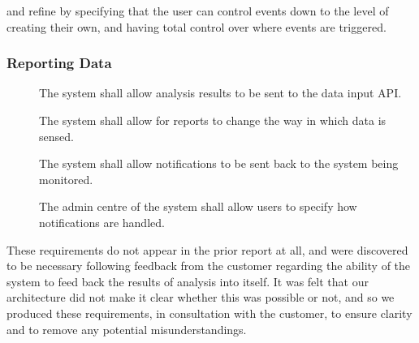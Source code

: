  and  refine  by specifying that the user can
control events down to the level of creating their own, and having
total control over where events are triggered.

\subsubsection{Reporting Data}
\label{sec:requirements-functional-feedback}

\begin{description}
 \item[] The system shall allow analysis results to be sent
 to the data input API.

 \item[] The system shall allow for reports to change the way
 in which data is sensed.

 \item[] The system shall allow notifications to be sent back
 to the system being monitored.

 \item[] The admin centre of the system shall allow users to
 specify how notifications are handled. 
\end{description}

These requirements do not appear in the prior report at all, and were
discovered to be necessary following feedback from the customer
regarding the ability of the system to feed back the results of
analysis into itself. It was felt that our architecture did not make
it clear whether this was possible or not, and so we produced these
requirements, in consultation with the customer, to ensure clarity and
to remove any potential misunderstandings.
